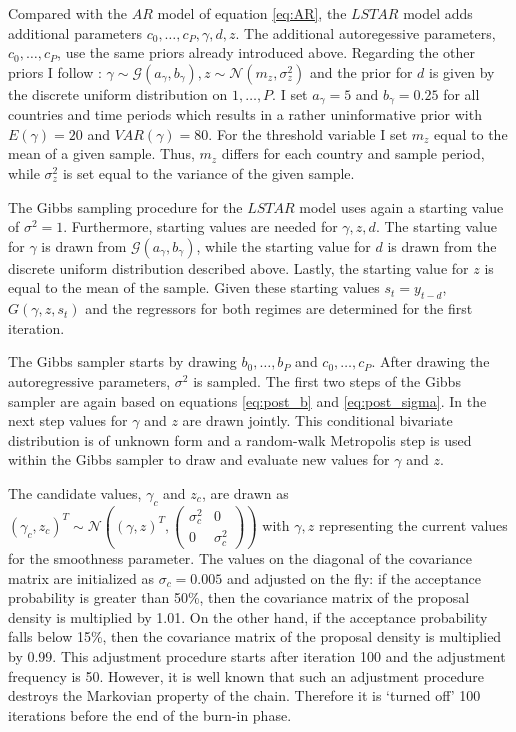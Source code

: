 \documentclass[12pt,letterpaper,fleqn]{article}           %
\begin{document}
Compared with the $AR$ model of equation \eqref{eq:AR}, the $LSTAR$ model adds additional parameters $c_0,\ldots,c_P, \gamma, d, z$. The additional autoregessive parameters, $c_0,\ldots,c_P$, use the same priors already introduced above. Regarding the other priors I follow \textcite{lopes06}: $\gamma \sim \mathcal{G}(a_\gamma, b_\gamma), z \sim \mathcal{N}(m_z, \sigma^2_z)$ and the prior for $d$ is given by the discrete uniform distribution on $1,\ldots,P$. I set $a_\gamma = 5$ and $b_\gamma = 0.25$ for all countries and time periods which results in a rather uninformative prior with $E(\gamma) = 20$ and $VAR(\gamma) = 80$. 
For the threshold variable I set $m_z$ equal to the mean of a given sample. Thus, $m_z$ differs for each country and sample period, while $\sigma^2_z$ is set equal to the variance of the given sample.

The Gibbs sampling procedure for the $LSTAR$ model uses again a starting value of $\sigma^2 = 1$. Furthermore, starting values are needed for $\gamma, z, d$. The starting value for $\gamma$ is drawn from $\mathcal{G}(a_\gamma, b_\gamma)$, while the starting value for $d$ is drawn from the discrete uniform distribution described above. Lastly, the starting value for $z$ is equal to the mean of the sample. Given these starting values $s_t = y_{t-d}$, $G(\gamma, z, s_t)$ and the regressors for both regimes are determined for the first iteration. 

The Gibbs sampler starts by drawing $b_0,\ldots,b_P$ and $c_0,\ldots,c_P$. After drawing the autoregressive parameters, $\sigma^2$ is sampled. The first two steps of the Gibbs sampler are again based on equations \eqref{eq:post_b} and \eqref{eq:post_sigma}. In the next step values for $\gamma$ and $z$ are drawn jointly. This conditional bivariate distribution is of unknown form and a random-walk Metropolis step is used within the Gibbs sampler to draw and evaluate new values for $\gamma$ and $z$. 

The candidate values, $\gamma_c$ and $z_c$, are drawn as $(\gamma_c, z_c)^T \sim \mathcal{N}\left((\gamma, z)^T,  \left( \begin{smallmatrix} \sigma_c^2&0\\ 0 & \sigma_c^2 \end{smallmatrix} \right)\right)$ with $\gamma, z$ representing the current values for the smoothness parameter. The values on the diagonal of the covariance matrix %
are initialized as $\sigma_c = 0.005$ and adjusted on the fly: if the acceptance probability is greater than 50\%, then the covariance matrix of the proposal density is multiplied by 1.01. On the other hand, if the acceptance probability falls below 15\%, then the covariance matrix of the proposal density is multiplied by 0.99. This adjustment procedure starts after iteration 100 and the adjustment frequency is 50. 
However, it is well known that such an adjustment procedure destroys the Markovian property of the chain. Therefore it is `turned off' 100 iterations before the end of the burn-in phase.
\end{document}
